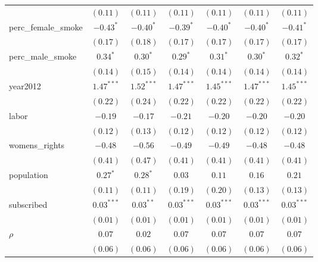\begin{table}[!h]
\begin{center}
\begin{tabular}{l c c c c c c }
                        & $(0.11)$     & $(0.11)$     & $(0.11)$     & $(0.11)$     & $(0.11)$     & $(0.11)$     \\
perc\_female\_smoke     & $-0.43^{*}$  & $-0.40^{*}$  & $-0.39^{*}$  & $-0.40^{*}$  & $-0.40^{*}$  & $-0.41^{*}$  \\
                        & $(0.17)$     & $(0.18)$     & $(0.17)$     & $(0.17)$     & $(0.17)$     & $(0.17)$     \\
perc\_male\_smoke       & $0.34^{*}$   & $0.30^{*}$   & $0.29^{*}$   & $0.31^{*}$   & $0.30^{*}$   & $0.32^{*}$   \\
                        & $(0.14)$     & $(0.15)$     & $(0.14)$     & $(0.14)$     & $(0.14)$     & $(0.14)$     \\
year2012                & $1.47^{***}$ & $1.52^{***}$ & $1.47^{***}$ & $1.45^{***}$ & $1.47^{***}$ & $1.45^{***}$ \\
                        & $(0.22)$     & $(0.24)$     & $(0.22)$     & $(0.22)$     & $(0.22)$     & $(0.22)$     \\
labor                   & $-0.19$      & $-0.17$      & $-0.21$      & $-0.20$      & $-0.20$      & $-0.20$      \\
                        & $(0.12)$     & $(0.13)$     & $(0.12)$     & $(0.12)$     & $(0.12)$     & $(0.12)$     \\
womens\_rights          & $-0.48$      & $-0.56$      & $-0.49$      & $-0.49$      & $-0.48$      & $-0.48$      \\
                        & $(0.41)$     & $(0.47)$     & $(0.41)$     & $(0.41)$     & $(0.41)$     & $(0.41)$     \\
population              & $0.27^{*}$   & $0.28^{*}$   & $0.03$       & $0.11$       & $0.16$       & $0.21$       \\
                        & $(0.11)$     & $(0.11)$     & $(0.19)$     & $(0.20)$     & $(0.13)$     & $(0.13)$     \\
subscribed              & $0.03^{***}$ & $0.03^{**}$  & $0.03^{***}$ & $0.03^{***}$ & $0.03^{***}$ & $0.03^{***}$ \\
                        & $(0.01)$     & $(0.01)$     & $(0.01)$     & $(0.01)$     & $(0.01)$     & $(0.01)$     \\
$\rho$                  & $0.07$       & $0.02$       & $0.07$       & $0.07$       & $0.07$       & $0.07$       \\
                        & $(0.06)$     & $(0.06)$     & $(0.06)$     & $(0.06)$     & $(0.06)$     & $(0.06)$     \\

\end{tabular}
\end{center}
\end{table}
